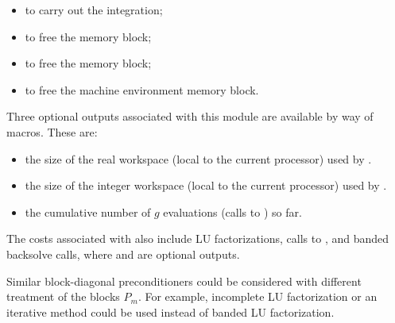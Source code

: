 \begin{itemize}
\item  {} 
  to carry out the integration;
  
\item  {} 
  to free the {\cvbbdpre} memory block;
  
\item  {} 
  to free the {\cvode} memory block;
  
\item  {}
  to free the machine environment memory block.

\end{itemize}

\noindent Three optional outputs associated with this module are available by way of
macros. 
These are:
\begin{itemize}
\item  {} the size of the real workspace (local to
  the current processor) used by {\cvbbdpre}.
\item  {} the size of the integer workspace (local to
  the current processor) used by {\cvbbdpre}.
\item  {} the cumulative number of $g$ evaluations (calls
  to ) so far.
\end{itemize}

The costs associated with {\cvbbdpre} also include  LU
factorizations,  calls to , and  banded
backsolve calls, where  and  are optional {\cvode}
outputs.

Similar block-diagonal preconditioners could be considered with different
treatment of the blocks $P_m$. For example, incomplete LU factorization or
an iterative method could be used instead of banded LU factorization.

